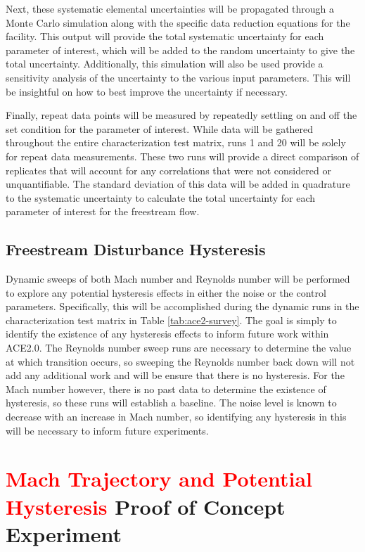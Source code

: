 Next, these systematic elemental uncertainties will be propagated through a Monte Carlo simulation along with the specific data reduction equations for the facility. This output will provide the total systematic uncertainty for each parameter of interest, which will be added to the random uncertainty to give the total uncertainty. Additionally, this simulation will also be used provide a sensitivity analysis of the uncertainty to the various input parameters. This will be insightful on how to best improve the uncertainty if necessary.

Finally, repeat data points will be measured by repeatedly settling on and off the set condition for the parameter of interest. While data will be gathered throughout the entire characterization test matrix, runs 1 and 20 will be solely for repeat data measurements. These two runs will provide a direct comparison of replicates that will account for any correlations that were not considered or unquantifiable. The standard deviation of this data will be added in quadrature to the systematic uncertainty to calculate the total uncertainty for each parameter of interest for the freestream flow.

\subsection{Freestream Disturbance Hysteresis}

Dynamic sweeps of both Mach number and Reynolds number will be performed to explore any potential hysteresis effects in either the noise or the control parameters. Specifically, this will be accomplished during the dynamic runs in the characterization test matrix in Table \ref{tab:ace2-survey}. The goal is simply to identify the existence of any hysteresis effects to inform future work within ACE2.0. The Reynolds number sweep runs are necessary to determine the value at which transition occurs, so sweeping the Reynolds number back down will not add any additional work and will be ensure that there is no hysteresis. For the Mach number however, there is no past data to determine the existence of hysteresis, so these runs will establish a baseline. The noise level is known to decrease with an increase in Mach number, so identifying any hysteresis in this will be necessary to inform future experiments.

\section{\textcolor{red}{Mach Trajectory and Potential Hysteresis} Proof of Concept Experiment}

